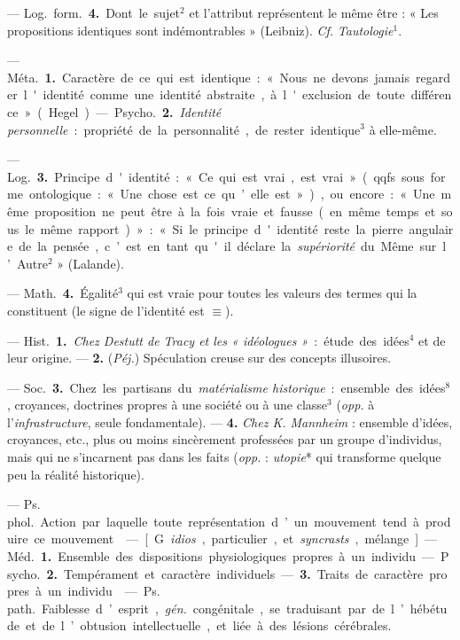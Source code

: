 \begin{itemize}[leftmargin=1cm, label=, itemsep=1pt]
— \si{Log.} \si{form.} {\bf 4.} Dont le sujet$^2$ et l’attribut représentent
le même être : « Les propositions identiques sont
indémontrables » (Leibniz). {\it Cf.} {\it Tautologie}$^1$.

 — \si{Méta.} {\bf 1.} Caractère de ce qui est identique :
« Nous ne devons jamais regarder l'identité comme une identité abstraite, à
l'exclusion de toute différence » (Hegel).

— \si{Psycho.} {\bf 2.} {\it Identité personnelle} : propriété de la
personnalité, de rester identique$^3$ à elle-même.

— \si{Log.} {\bf 3.} Principe d'identité : « Ce qui est vrai, est
vrai » (qqfs. sous forme ontologique : « Une chose est ce qu’elle est »), ou
encore : « Une même proposition ne peut être à la fois vraie et fausse (en
même temps et sous le même rapport) » : « Si le principe d'identité reste la
pierre angulaire de la pensée, c’est en tant qu'il déclare la
{\it supériorité} du Même sur l’Autre$^2$ » (Lalande).

— \si{Math.} {\bf 4.} Égalité$^3$ qui est vraie pour toutes les valeurs des
termes qui la constituent (le signe de l’identité est $\equiv$).

 — \si{Hist.} {\bf 1.} {\it Chez Destutt de Tracy et les
« idéologues »} : étude des idées$^4$ et de leur origine. — {\bf 2.}
({\it Péj.}) Spéculation creuse sur des concepts illusoires.

— \si{Soc.} {\bf 3.} Chez les partisans du {\it matérialisme historique} :
ensemble des idées$^8$, croyances, doctrines propres à une société ou à une
classe$^3$ ({\it opp.} à l'{\it infrastructure}, seule fondamentale).
— {\bf 4.} {\it Chez K. Mannheim} : ensemble d'idées, croyances, etc., plus
ou moins sincèrement professées par un groupe d’individus, mais qui ne
s’incarnent pas dans les faits ({\it opp.} : {\it utopie}* qui transforme
quelque peu la réalité historique).

 — \si{Ps. phol.} Action par laquelle toute
représentation d’un mouvement tend à produire ce mouvement.

 — [G. {\it idios}, particulier, et {\it syncrasts},
mélange] — \si{Méd.} {\bf 1.} Ensemble des dispositions physiologiques
propres à un individu. — \si{Psycho.} {\bf 2.} Tempérament et caractère
individuels. — {\bf 3.} Traits de caractère propres à un individu.

 — \si{Ps. path.} Faiblesse d’esprit, {\it gén.} congénitale, se
traduisant par de l’hébétude et de l’obtusion intellectuelle, et liée à des
lésions cérébrales.


\end{itemize}
